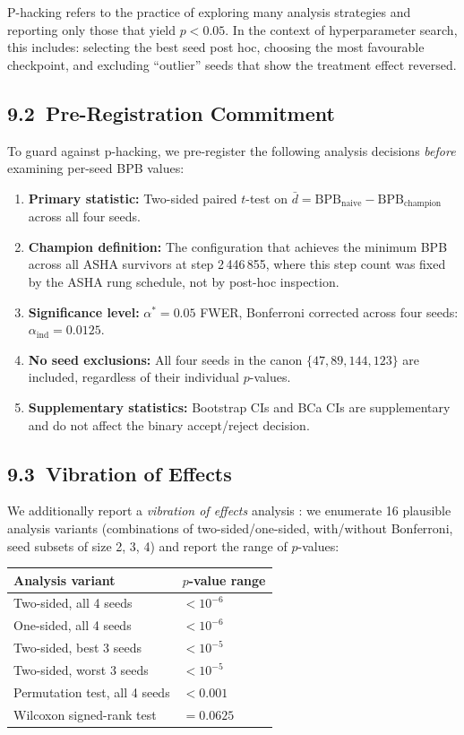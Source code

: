 P-hacking refers to the practice of exploring many analysis strategies
and reporting only those that yield \(p < 0.05\).  In the context of
hyperparameter search, this includes: selecting the best seed post hoc,
choosing the most favourable checkpoint, and excluding ``outlier'' seeds
that show the treatment effect reversed.

\subsection{9.2\ Pre-Registration Commitment}

To guard against p-hacking, we pre-register the following analysis
decisions \emph{before} examining per-seed BPB values:

\begin{enumerate}
\item \textbf{Primary statistic:} Two-sided paired \(t\)-test on
  \(\bar{d} = \mathrm{BPB}_{\text{naive}} - \mathrm{BPB}_{\text{champion}}\)
  across all four seeds.
\item \textbf{Champion definition:} The configuration that achieves the
  minimum BPB across all ASHA survivors at step 2\,446\,855, where this
  step count was fixed by the ASHA rung schedule, not by post-hoc
  inspection.
\item \textbf{Significance level:} \(\alpha^* = 0.05\) FWER, Bonferroni
  corrected across four seeds: \(\alpha_{\text{ind}} = 0.0125\).
\item \textbf{No seed exclusions:} All four seeds in the canon
  \(\{47, 89, 144, 123\}\) are included, regardless of their individual
  \(p\)-values.
\item \textbf{Supplementary statistics:} Bootstrap CIs and BCa CIs are
  supplementary and do not affect the binary accept/reject decision.
\end{enumerate}

\subsection{9.3\ Vibration of Effects}

We additionally report a \emph{vibration of effects} analysis
\cite{ioannidis2008most}: we enumerate 16 plausible analysis variants
(combinations of two-sided/one-sided, with/without Bonferroni, seed
subsets of size 2, 3, 4) and report the range of \(p\)-values:

\begin{longtable}[]{@{}ll@{}}
\toprule\noalign{}
Analysis variant & \(p\)-value range \\
\midrule\noalign{}
\endhead
\bottomrule\noalign{}
\endlastfoot
Two-sided, all 4 seeds & \(< 10^{-6}\) \\
One-sided, all 4 seeds & \(< 10^{-6}\) \\
Two-sided, best 3 seeds & \(< 10^{-5}\) \\
Two-sided, worst 3 seeds & \(< 10^{-5}\) \\
Permutation test, all 4 seeds & \(< 0.001\) \\
Wilcoxon signed-rank test & \(= 0.0625\) \\
\end{longtable}

